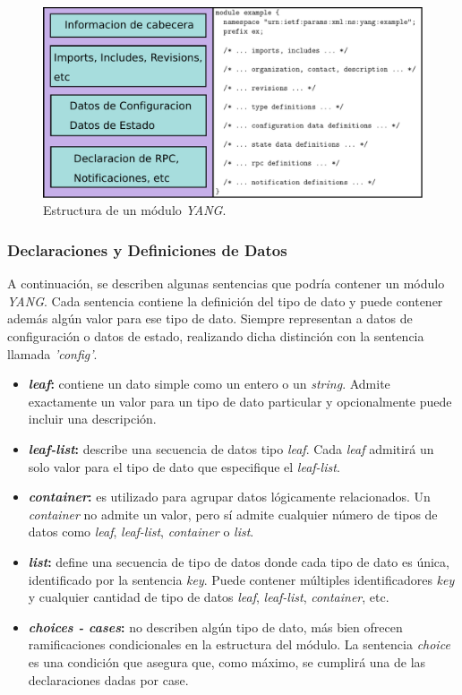   \begin{figure}[H]
	\centering
	\includegraphics[scale=0.5]{Figures/estructura_modulo.pdf}
	\caption{Estructura de un módulo \textit{YANG}.}
	\label{fig:estructura_modulo}
  \end{figure}

  \subsubsection{Declaraciones y Definiciones de Datos}
  A continuación, se describen algunas sentencias que podría contener un módulo \textit{YANG}. Cada sentencia contiene la definición del tipo de dato y puede contener además algún valor para ese tipo de dato. Siempre representan a datos de configuración o datos de estado, realizando dicha distinción con la sentencia llamada \textit{'config'}.  

  \begin{itemize}
	\item \textbf{\textit{leaf}:} contiene un dato simple como un entero o un \textit{string}. Admite exactamente un valor para un tipo de dato particular y opcionalmente puede incluir una descripción. 
	\item \textbf{\textit{leaf-list}:} describe una secuencia de datos tipo \textit{leaf}. Cada \textit{leaf} admitirá un solo valor para el tipo de dato que especifique el \textit{leaf-list}.
	\item \textbf{\textit{container}:} es utilizado para agrupar datos lógicamente relacionados. Un \textit{container} no admite un valor, pero sí admite cualquier número de tipos de datos como \textit{leaf}, \textit{leaf-list}, \textit{container} o \textit{list}.
	\item \textbf{\textit{list}:} define una secuencia de tipo de datos donde cada tipo de dato es única, identificado por la sentencia \textit{key}. Puede contener múltiples identificadores \textit{key} y cualquier cantidad de tipo de datos \textit{leaf}, \textit{leaf-list}, \textit{container}, etc.
	\item \textbf{\textit{choices - cases}:} no describen algún tipo de dato, más bien ofrecen ramificaciones condicionales en la estructura del módulo. La sentencia \textit{choice} es una condición que asegura que, como máximo, se cumplirá una de las declaraciones dadas por case.
\end{itemize}

